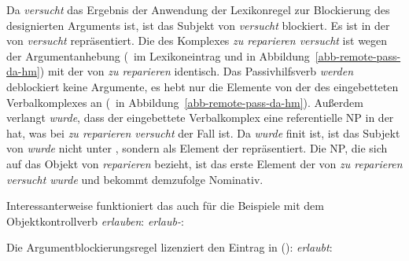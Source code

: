 {Da \emph{versucht} das Ergebnis der Anwendung der Lexikonregel zur Blockierung des designierten Arguments
ist, ist das Subjekt von \emph{versucht} blockiert. 
Es ist in der \dalist von \emph{versucht} repräsentiert. Die \compsl des Komplexes \emph{zu reparieren versucht}
ist wegen der Argumentanhebung (\, im Lexikoneintrag  und 
in Abbildung~\ref{abb-remote-pass-da-hm}) mit der \compsl von \emph{zu reparieren} identisch.
Das Passivhilfsverb \emph{werden} deblockiert keine Argumente, es hebt nur die
Elemente von der \compsl des eingebetteten Verbalkomplexes an (\, in
Abbildung~\ref{abb-remote-pass-da-hm}). Außerdem verlangt \emph{wurde}, dass der eingebettete
Verbalkomplex eine referentielle NP in der \dalist hat, was bei \emph{zu reparieren versucht} der Fall ist.
Da \emph{wurde} finit ist, ist das Subjekt von \emph{wurde} nicht unter \subj, sondern
als Element der \compsl repräsentiert. Die NP, die sich auf das Objekt von
\emph{reparieren} bezieht, ist das erste Element der \compsl von \emph{zu reparieren versucht wurde}
und bekommt demzufolge Nominativ.


Interessanterweise funktioniert das auch für die Beispiele mit dem Objektkontrollverb \emph{erlauben}:\label{page-remote-passive-erlauben}
\eas
\emph{erlaub-}:\\
\zs

\noindent
Die Argumentblockierungsregel lizenziert den Eintrag in ():
\eas
\emph{erlaubt}:\\
\zs

}
